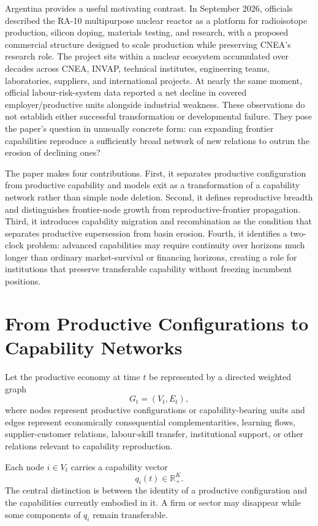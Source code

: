 \documentclass[11pt]{article}
\begin{document}
Argentina provides a useful motivating contrast. In September 2026, officials described the RA-10 multipurpose nuclear reactor as a platform for radioisotope production, silicon doping, materials testing, and research, with a proposed commercial structure designed to scale production while preserving CNEA's research role. The project sits within a nuclear ecosystem accumulated over decades across CNEA, INVAP, technical institutes, engineering teams, laboratories, suppliers, and international projects. At nearly the same moment, official labour-risk-system data reported a net decline in covered employer/productive units alongside industrial weakness. These observations do not establish either successful transformation or developmental failure. They pose the paper's question in unusually concrete form: can expanding frontier capabilities reproduce a sufficiently broad network of new relations to outrun the erosion of declining ones?

The paper makes four contributions. First, it separates productive configuration from productive capability and models exit as a transformation of a capability network rather than simple node deletion. Second, it defines reproductive breadth and distinguishes frontier-node growth from reproductive-frontier propagation. Third, it introduces capability migration and recombination as the condition that separates productive supersession from basin erosion. Fourth, it identifies a two-clock problem: advanced capabilities may require continuity over horizons much longer than ordinary market-survival or financing horizons, creating a role for institutions that preserve transferable capability without freezing incumbent positions.

\section{From Productive Configurations to Capability Networks}

Let the productive economy at time $t$ be represented by a directed weighted graph
\[
G_t=(V_t,E_t),
\]
where nodes represent productive configurations or capability-bearing units and edges represent economically consequential complementarities, learning flows, supplier-customer relations, labour-skill transfer, institutional support, or other relations relevant to capability reproduction.

Each node $i\in V_t$ carries a capability vector
\[
q_i(t)\in\mathbb{R}_+^K.
\]
The central distinction is between the identity of a productive configuration and the capabilities currently embodied in it. A firm or sector may disappear while some components of $q_i$ remain transferable.
\end{document}

